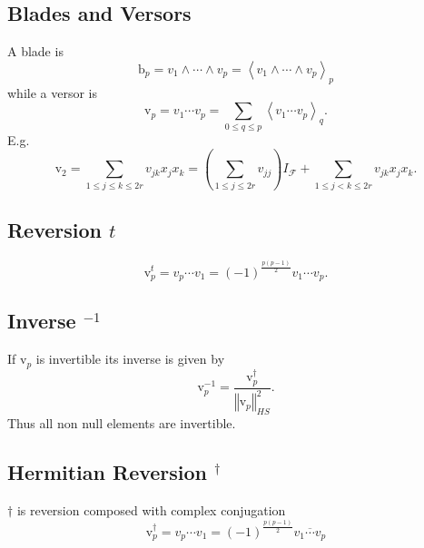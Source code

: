 \documentclass[aps,preprint]{revtex4}%
\begin{document}
\subsection{Blades and Versors}

A blade is
\begin{equation}
\mathrm{b}_{p}=v_{1}\wedge\cdots\wedge v_{p}=\left\langle v_{1}\wedge
\cdots\wedge v_{p}\right\rangle _{p}%
\end{equation}
while a versor is
\begin{equation}
\mathrm{v}_{p}=v_{1}\cdots v_{p}=\sum_{0\leq q\leq p}\left\langle v_{1}\cdots
v_{p}\right\rangle _{q}.
\end{equation}
E.g.%
\begin{equation}
\mathrm{v}_{2}=\sum_{1\leq j\leq k\leq2r}v_{jk}x_{j}x_{k}=\left(  \sum_{1\leq
j\leq2r}v_{jj}\right)  I_{\mathcal{F}}+\sum_{1\leq j<k\leq2r}v_{jk}x_{j}x_{k}.
\end{equation}


\subsection{Reversion $t$}%

\begin{equation}
\mathrm{v}_{p}^{t}=v_{p}\cdots v_{1}=\left(  -1\right)  ^{\frac{p\left(
p-1\right)  }{2}}v_{1}\cdots v_{p}.
\end{equation}


\subsection{Inverse $^{-1}$}

\bigskip If $\mathrm{v}_{p}$ is invertible its inverse is given by
\begin{equation}
\mathrm{v}_{p}^{-1}=\frac{\mathrm{v}_{p}^{\dagger}}{\left\Vert \mathrm{v}%
_{p}\right\Vert _{HS}^{2}}.
\end{equation}
Thus all non null elements are invertible.

\subsection{Hermitian Reversion $^{\dagger}$}

$\dagger$ is reversion composed with complex conjugation
\begin{equation}
\mathrm{v}_{p}^{\dagger}=v_{p}\cdots v_{1}=\left(  -1\right)  ^{\frac{p\left(
p-1\right)  }{2}}\overline{v_{1}\cdots v_{p}}%
\end{equation}
\end{document}
